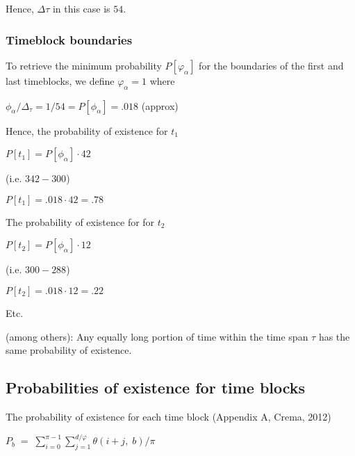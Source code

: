 \documentclass[a4paper,12pt,english]{sphinxhowto}
\begin{document}
Hence, \(\Delta \tau\) in this case is \(54\).



\subsubsection{Time\sphinxhyphen{}block boundaries}
\label{\detokenize{Uncertainty:time-block-boundaries}}
To retrieve the minimum probability \(P[\varphi_\alpha]\) for the boundaries of the first and last time\sphinxhyphen{}blocks,
we define \(\varphi_\alpha = 1\) where

\(\phi_\alpha / \Delta_\tau = 1/54 = P[\phi_\alpha] = .018\) (approx)

Hence, the probability of existence for \(t_1\)

\(P[t_1] = P[\phi_\alpha] \cdot 42\)

(i.e. \(342 - 300\))

\(P[t_1] = .018 \cdot 42  =  .78\)

The probability of existence for for \(t_2\)

\(P[t_2] = P[\phi_\alpha] \cdot 12\)

(i.e. \(300 - 288\))

\(P[t_2] = .018 \cdot 12  =  .22\)

Etc.


 (among others): Any equally long portion of time within the time span \(\tau\) has the same probability of existence.



\subsection{Probabilities of existence for time blocks}
\label{\detokenize{Uncertainty:probabilities-of-existence-for-time-blocks}}
The probability of existence for each time block (Appendix A, Crema, 2012)

\(P_b \;=\; {\sum_{i=0}^{\pi-1} \sum_{j=1}^{d/\varphi} \theta (i+j,\;b)} / {\pi}\)
\end{document}
